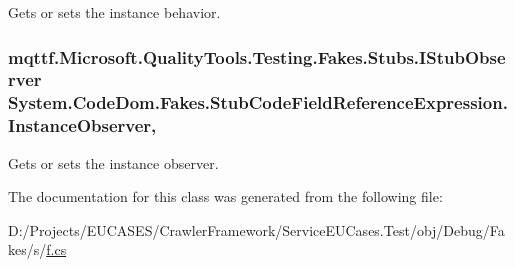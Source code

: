 Gets or sets the instance behavior.

\hypertarget{class_system_1_1_code_dom_1_1_fakes_1_1_stub_code_field_reference_expression_a89dac4e6212424b754f60ecf04b9ed9e}{
\subsubsection[{Instance\-Observer}]{\setlength{\rightskip}{0pt plus 5cm}mqttf.\-Microsoft.\-Quality\-Tools.\-Testing.\-Fakes.\-Stubs.\-I\-Stub\-Observer System.\-Code\-Dom.\-Fakes.\-Stub\-Code\-Field\-Reference\-Expression.\-Instance\-Observer\hspace{0.3cm}{\ttfamily [get]}, {\ttfamily [set]}}}\label{class_system_1_1_code_dom_1_1_fakes_1_1_stub_code_field_reference_expression_a89dac4e6212424b754f60ecf04b9ed9e}


Gets or sets the instance observer.



The documentation for this class was generated from the following file\-:\begin{DoxyCompactItemize}
\item 
D\-:/\-Projects/\-E\-U\-C\-A\-S\-E\-S/\-Crawler\-Framework/\-Service\-E\-U\-Cases.\-Test/obj/\-Debug/\-Fakes/s/\hyperlink{s_2f_8cs}{f.\-cs}\end{DoxyCompactItemize}
